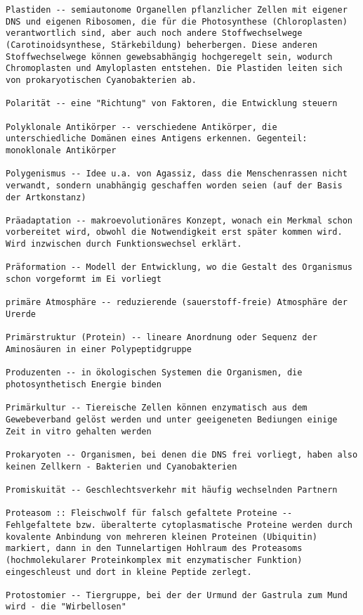 \documentclass{article}
\begin{document}
\begin{verbatim}
Plastiden -- semiautonome Organellen pflanzlicher Zellen mit eigener DNS und eigenen Ribosomen, die für die Photosynthese (Chloroplasten) verantwortlich sind, aber auch noch andere Stoffwechselwege (Carotinoidsynthese, Stärkebildung) beherbergen. Diese anderen Stoffwechselwege können gewebsabhängig hochgeregelt sein, wodurch Chromoplasten und Amyloplasten entstehen. Die Plastiden leiten sich von prokaryotischen Cyanobakterien ab.

Polarität -- eine "Richtung" von Faktoren, die Entwicklung steuern

Polyklonale Antikörper -- verschiedene Antikörper, die unterschiedliche Domänen eines Antigens erkennen. Gegenteil: monoklonale Antikörper

Polygenismus -- Idee u.a. von Agassiz, dass die Menschenrassen nicht verwandt, sondern unabhängig geschaffen worden seien (auf der Basis der Artkonstanz)

Präadaptation -- makroevolutionäres Konzept, wonach ein Merkmal schon vorbereitet wird, obwohl die Notwendigkeit erst später kommen wird. Wird inzwischen durch Funktionswechsel erklärt.

Präformation -- Modell der Entwicklung, wo die Gestalt des Organismus schon vorgeformt im Ei vorliegt

primäre Atmosphäre -- reduzierende (sauerstoff-freie) Atmosphäre der Urerde

Primärstruktur (Protein) -- lineare Anordnung oder Sequenz der Aminosäuren in einer Polypeptidgruppe

Produzenten -- in ökologischen Systemen die Organismen, die photosynthetisch Energie binden

Primärkultur -- Tiereische Zellen können enzymatisch aus dem Gewebeverband gelöst werden und unter geeigeneten Bediungen einige Zeit in vitro gehalten werden

Prokaryoten -- Organismen, bei denen die DNS frei vorliegt, haben also keinen Zellkern - Bakterien und Cyanobakterien

Promiskuität -- Geschlechtsverkehr mit häufig wechselnden Partnern

Proteasom :: Fleischwolf für falsch gefaltete Proteine -- Fehlgefaltete bzw. überalterte cytoplasmatische Proteine werden durch kovalente Anbindung von mehreren kleinen Proteinen (Ubiquitin) markiert, dann in den Tunnelartigen Hohlraum des Proteasoms (hochmolekularer Proteinkomplex mit enzymatischer Funktion) eingeschleust und dort in kleine Peptide zerlegt.

Protostomier -- Tiergruppe, bei der der Urmund der Gastrula zum Mund wird - die "Wirbellosen"


\end{verbatim}
\end{document}
